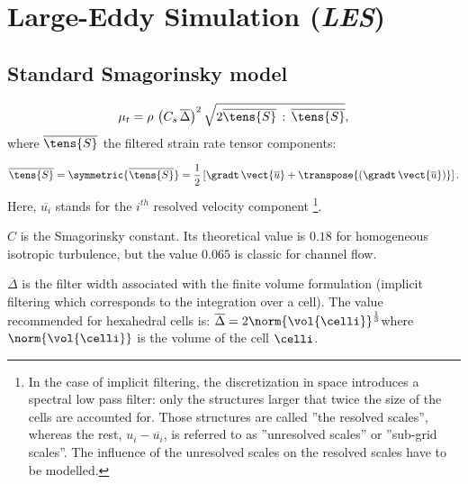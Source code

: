 \section{Large-Eddy Simulation (\emph{LES})}

\subsection{Standard Smagorinsky model}

\begin{equation}
\mu_{t}=\rho \, \left( C_{s}\,\overline{\Delta } \right)^{2}
\sqrt{2\overline{\tens{S}} \,: \, \overline{\tens{S}}},
\end{equation}%
%
where $\overline{\tens{S}}$ the filtered strain rate tensor components:

\begin{equation}
\overline{\tens{S}}= \symmetric{\overline{\tens{S}}} =
\frac{1}{2} \left[ \gradt \, \vect{\overline{u}} + \transpose{\left( \gradt \, \vect{\overline{u}} \right)}
\right].
\end{equation}
%
%
Here, $\overline{u_{i}}$ stands for the $i^{th}$ resolved velocity component
\footnote{%
In the case of implicit filtering, the discretization in space introduces a
spectral low pass filter: only the structures larger that twice the size of
the cells are accounted for. Those structures are called ''the resolved
scales'', whereas the rest, $u_{i}-\overline{u_{i}}$, is referred to as
''unresolved scales'' or ''sub-grid scales''. The influence of the
unresolved scales on the resolved scales have to be modelled.}. 

$C$ is the Smagorinsky constant. Its theoretical value is $0.18$ for
homogeneous isotropic turbulence, but the value $0.065$ is classic for
channel flow. 

$\overline{\Delta }$ is the filter width associated with the finite volume
formulation (implicit filtering which corresponds to the integration over a
cell). The value recommended for hexahedral cells is: $\overline{\Delta }
=2 \norm{\vol{\celli}}^{\frac{1}{3}}$where $\norm{\vol{\celli}}$ is the volume of the cell $\celli$.

